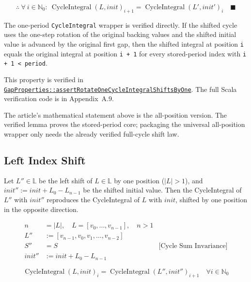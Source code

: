 \begin{equation*}
\therefore \ \forall \ i \in \mathbb{N}_0: \ \operatorname{CycleIntegral}(L, init)_{i+1} = \operatorname{CycleIntegral}(L', init')_{i} \quad \blacksquare
\end{equation*}

The one-period \texttt{CycleIntegral} wrapper is verified directly. If the
shifted cycle uses the one-step rotation of the original backing values and
the shifted initial value is advanced by the original first gap, then the
shifted integral at position \texttt{i} equals the original integral at
position \texttt{i + 1} for every stored-period index with
\texttt{i + 1 < period}.

{\raggedright
This property is verified in
\href{https://github.com/thiagomata/prime-numbers/blob/integral-cycle-article-v1.0.0/src/main/scala/v1/chapter4/cycle/integral/recursive/properties/GapProperties.scala}{\texttt{GapProperties::\allowbreak assertRotateOneCycleIntegralShiftsByOne}}.
The full Scala verification code is in Appendix~A.9.
\par}

The article's mathematical statement above is the all-position version. The
verified lemma proves the stored-period core; packaging the universal
all-position wrapper only needs the already verified full-cycle shift law.

\subsection{Left Index Shift}

Let $L'' \in \mathbb{L}$ be the left shift of $L \in \mathbb{L}$ by one
position ($|L| > 1$), and $init'' := init + L_0 - L_{n-1}$ be the shifted
initial value. Then the CycleIntegral of $L''$ with $init''$ reproduces the
CycleIntegral of $L$ with $init$, shifted by one position in the opposite
direction.

\begin{equation*}
\begin{aligned}
n &= |L|, \quad L = [v_0, \dots, v_{n-1}], \quad n > 1 \\
L'' &:= [v_{n-1}, v_0, v_1, \dots, v_{n-2}] \\
S'' &= S \quad &\text{[Cycle Sum Invariance]} \\
init'' &:= init + L_0 - L_{n-1}
\end{aligned}
\end{equation*}

\begin{equation*}
\operatorname{CycleIntegral}(L, init)_i = \operatorname{CycleIntegral}(L'', init'')_{i+1} \quad \forall i \in \mathbb{N}_0
\end{equation*}

